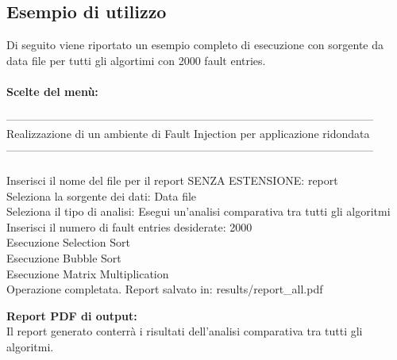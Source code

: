 \documentclass{article}
\begin{document}
\subsection{Esempio di utilizzo}
Di seguito viene riportato un esempio completo di esecuzione con sorgente da data file per tutti gli algortimi con 2000 fault entries.\\\\
\textbf{Scelte del menù:}\\
\begin{tcolorbox}[colback=black, coltext=white, sharp corners, boxrule=0.5mm, width=\textwidth]
---------------------------------------------------------------------------------------------------\\
 Realizzazione di un ambiente di Fault Injection per applicazione ridondata \\
---------------------------------------------------------------------------------------------------\\ \\
Inserisci il nome del file per il report SENZA ESTENSIONE: report\\
Seleziona la sorgente dei dati: Data file\\
Seleziona il tipo di analisi: Esegui un'analisi comparativa tra tutti gli algoritmi\\
Inserisci il numero di fault entries desiderate: 2000\\
Esecuzione Selection Sort\\
Esecuzione Bubble Sort\\
Esecuzione Matrix Multiplication\\
Operazione completata. Report salvato in: results/report\_all.pdf\\
\end{tcolorbox}
\newpage
\textbf{Report PDF di output:}\\
Il report generato conterrà i risultati dell'analisi comparativa tra tutti gli algoritmi.
\end{document}
